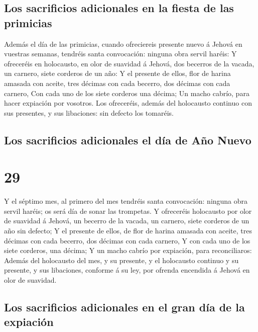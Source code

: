 \hypertarget{los-sacrificios-adicionales-en-la-fiesta-de-las-primicias}{%
\subsection{Los sacrificios adicionales en la fiesta de las
primicias}\label{los-sacrificios-adicionales-en-la-fiesta-de-las-primicias}}

 Además el día de las primicias, cuando ofreciereis
presente nuevo á Jehová en vuestras semanas, tendréis santa convocación:
ninguna obra servil haréis:  Y ofreceréis en holocausto,
en olor de suavidad á Jehová, dos becerros de la vacada, un carnero,
siete corderos de un año:  Y el presente de ellos, flor
de harina amasada con aceite, tres décimas con cada becerro, dos décimas
con cada carnero,  Con cada uno de los siete corderos una
décima;  Un macho cabrío, para hacer expiación por
vosotros.  Los ofreceréis, además del holocausto continuo
con sus presentes, y sus libaciones: sin defecto los tomaréis.

\hypertarget{los-sacrificios-adicionales-el-duxeda-de-auxf1o-nuevo}{%
\subsection{Los sacrificios adicionales el día de Año
Nuevo}\label{los-sacrificios-adicionales-el-duxeda-de-auxf1o-nuevo}}

\hypertarget{section-28}{%
\section{29}\label{section-28}}

 Y el séptimo mes, al primero del mes tendréis santa
convocación: ninguna obra servil haréis; os será día de sonar las
trompetas.  Y ofreceréis holocausto por olor de suavidad á
Jehová, un becerro de la vacada, un carnero, siete corderos de un año
sin defecto;  Y el presente de ellos, de flor de harina
amasada con aceite, tres décimas con cada becerro, dos décimas con cada
carnero,  Y con cada uno de los siete corderos, una
décima;  Y un macho cabrío por expiación, para
reconciliaros:  Además del holocausto del mes, y su
presente, y el holocausto continuo y su presente, y sus libaciones,
conforme á su ley, por ofrenda encendida á Jehová en olor de suavidad.

\hypertarget{los-sacrificios-adicionales-en-el-gran-duxeda-de-la-expiaciuxf3n}{%
\subsection{Los sacrificios adicionales en el gran día de la
expiación}\label{los-sacrificios-adicionales-en-el-gran-duxeda-de-la-expiaciuxf3n}}

